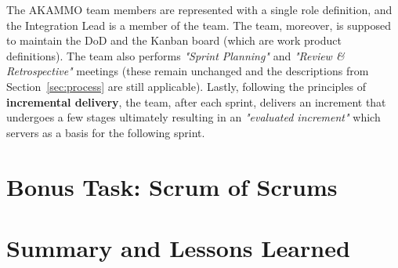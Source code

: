 \documentclass[conference]{IEEEtran}
\begin{document}
The \selectfont AKAMMO\rmfamily{} team members are represented
with a single role definition, and the Integration Lead is a member of the team. The
team, moreover, is supposed to maintain the DoD and the Kanban board (which are
work product definitions). The team also performs \textit{"Sprint Planning"} and
\textit{"Review \& Retrospective"} meetings (these remain unchanged and the
descriptions from Section~\ref{sec:process} are still applicable). Lastly,
following the principles of \textbf{incremental delivery}, the team, after each
sprint, delivers an increment that undergoes a few stages ultimately resulting
in an \textit{"evaluated increment"} which servers as a basis for the following
sprint.

\section{Bonus Task: Scrum of Scrums}
\label{sec:bonus_task}



\section{Summary and Lessons Learned}
\label{sec:summary}



\end{document}
